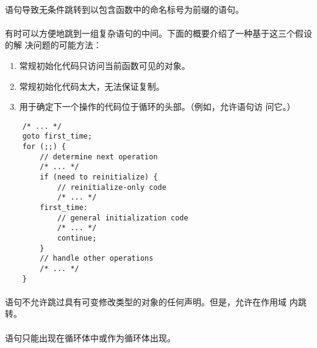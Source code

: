 {\semantic
\paragraph{}
语句导致无条件跳转到以包含函数中的命名标号为前缀的语句。

\paragraph{}
\ex 有时可以方便地跳到一组复杂语句的中间。下面的概要介绍了一种基于这三个假设的解
决问题的可能方法：
\begin{enumerate}
  \item{常规初始化代码只访问当前函数可见的对象。}
  \item{常规初始化代码太大，无法保证复制。}
  \item{用于确定下一个操作的代码位于循环的头部。（例如，允许语句访
    问它。）}
\end{enumerate}
\begin{lstlisting}
    /* ... */
    goto first_time;
    for (;;) {
        // determine next operation
        /* ... */
        if (need to reinitialize) {
            // reinitialize-only code
            /* ... */
        first_time:
            // general initialization code
            /* ... */
            continue;
        }
        // handle other operations
        /* ... */
    }
\end{lstlisting}

\paragraph{}
\ex {}语句不允许跳过具有可变修改类型的对象的任何声明。但是，允许在作用域
内跳转。

\constraint
\paragraph{}
语句只能出现在循环体中或作为循环体出现。

\semantic
}
